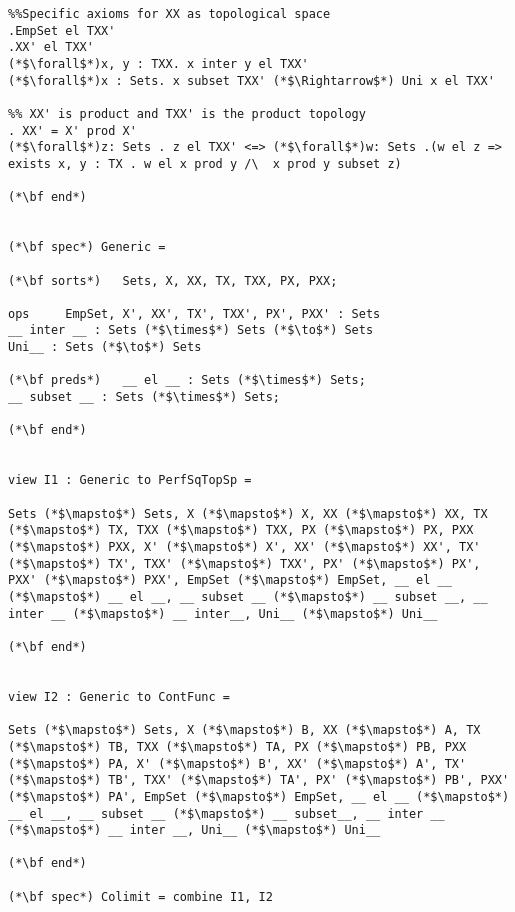 \begin{lstlisting}
%%Specific axioms for XX as topological space
.EmpSet el TXX'
.XX' el TXX'
(*$\forall$*)x, y : TXX. x inter y el TXX'
(*$\forall$*)x : Sets. x subset TXX' (*$\Rightarrow$*) Uni x el TXX'

%% XX' is product and TXX' is the product topology
. XX' = X' prod X'
(*$\forall$*)z: Sets . z el TXX' <=> (*$\forall$*)w: Sets .(w el z => exists x, y : TX . w el x prod y /\  x prod y subset z) 

(*\bf end*)


(*\bf spec*) Generic =

(*\bf sorts*)   Sets, X, XX, TX, TXX, PX, PXX;

ops 	EmpSet, X', XX', TX', TXX', PX', PXX' : Sets
__ inter __ : Sets (*$\times$*) Sets (*$\to$*) Sets
Uni__ : Sets (*$\to$*) Sets

(*\bf preds*)   __ el __ : Sets (*$\times$*) Sets;
__ subset __ : Sets (*$\times$*) Sets;

(*\bf end*)


view I1 : Generic to PerfSqTopSp =

Sets (*$\mapsto$*) Sets, X (*$\mapsto$*) X, XX (*$\mapsto$*) XX, TX (*$\mapsto$*) TX, TXX (*$\mapsto$*) TXX, PX (*$\mapsto$*) PX, PXX (*$\mapsto$*) PXX, X' (*$\mapsto$*) X', XX' (*$\mapsto$*) XX', TX' (*$\mapsto$*) TX', TXX' (*$\mapsto$*) TXX', PX' (*$\mapsto$*) PX', PXX' (*$\mapsto$*) PXX', EmpSet (*$\mapsto$*) EmpSet, __ el __ (*$\mapsto$*) __ el __, __ subset __ (*$\mapsto$*) __ subset __, __ inter __ (*$\mapsto$*) __ inter__, Uni__ (*$\mapsto$*) Uni__

(*\bf end*)


view I2 : Generic to ContFunc =

Sets (*$\mapsto$*) Sets, X (*$\mapsto$*) B, XX (*$\mapsto$*) A, TX (*$\mapsto$*) TB, TXX (*$\mapsto$*) TA, PX (*$\mapsto$*) PB, PXX (*$\mapsto$*) PA, X' (*$\mapsto$*) B', XX' (*$\mapsto$*) A', TX' (*$\mapsto$*) TB', TXX' (*$\mapsto$*) TA', PX' (*$\mapsto$*) PB', PXX' (*$\mapsto$*) PA', EmpSet (*$\mapsto$*) EmpSet, __ el __ (*$\mapsto$*) __ el __, __ subset __ (*$\mapsto$*) __ subset__, __ inter __ (*$\mapsto$*) __ inter __, Uni__ (*$\mapsto$*) Uni__

(*\bf end*)

(*\bf spec*) Colimit = combine I1, I2
\end{lstlisting}

